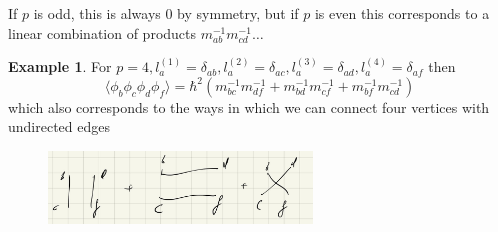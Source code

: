 \documentclass{article}
\theoremstyle{definition}
\newtheorem{example}{Example}
\begin{document}
If $p$ is odd, this is always 0 by symmetry, but if $p$ is even this corresponds
to a linear combination of products $m_{ab}^{-1} m_{cd}^{-1} \dots$

\begin{example}
  For $p=4, l^{(1)}_a = \delta_{ab}, l^{(2)}_a = \delta_{ac}, l^{(3)}_a =
  \delta_{ad}, l^{(4)}_a = \delta_{af}$ then
  \begin{equation}
    \langle \phi_b \phi_c \phi_d \phi_f \rangle = \hbar^2 (m_{bc}^{-1} m_{df}^{-1} + m_{bd}^{-1} m_{cf}^{-1} +
    m_{bf}^{-1} m_{cd}^{-1})
  \end{equation}
  which also corresponds to the ways in which we can connect four vertices with
  undirected edges
  \begin{figure}[H]
    \centering
    \includegraphics[width=7cm]{res/AQFT/connecting_four_vertices}
    \label{connecting_four_vertices}
  \end{figure}
\end{example}
\end{document}
